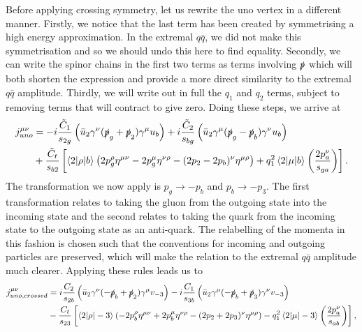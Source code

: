Before applying crossing symmetry, let us rewrite the uno vertex in a different manner. Firstly, we notice that the last term has been created by symmetrising a high energy approximation. In the extremal $q\bar{q}$, we did not make this symmetrisation and so we should undo this here to find equality. Secondly, we can write the spinor chains in the first two terms as terms involving $\slashed{p}$ which will both shorten the expression and provide a more direct similarity to the extremal $q\bar{q}$ amplitude. Thirdly, we will write out in full the $q_1$ and $q_2$ terms, subject to removing terms that will contract to give zero. Doing these steps, we arrive at
\begin{equation}
\begin{split}
j_{uno}^{\mu \nu} &= -i \frac{\tilde{C}_1}{s_{2g}} \left(\bar{u}_2 \gamma^\nu (\slashed{p}_g + \slashed{p}_2) \gamma^\mu u_b \right) + i \frac{\tilde{C}_2}{s_{bg}} \left(\bar{u}_2 \gamma^\mu (\slashed{p}_g - \slashed{p}_b)\gamma^\nu u_b \right) \\
&+ \frac{\tilde{C}_t}{s_{b2}} \left[\mathinner{\langle2\vert\rho\vert b\rangle}_{} \left(2p_g^\rho \eta^{\mu \nu} - 2 p_g^\mu \eta^{\nu \rho} - (2p_2 - 2p_b)^\nu \eta^{\mu \rho} \right) + q_1^2 \mathinner{\langle2\vert\mu\vert b\rangle}_{} \left(\frac{2p_a^\nu}{s_{ga}} \right) \right].
\end{split}
\end{equation}
The transformation we now apply is $p_g \to -p_b$ and $p_b \to -p_3$. The first transformation relates to taking the gluon from the outgoing state into the incoming state and the second relates to taking the quark from the incoming state to the outgoing state as an anti-quark. The relabelling of the momenta in this fashion is chosen such that the conventions for incoming and outgoing particles are preserved, which will make the relation to the extremal $q\bar{q}$ amplitude much clearer. Applying these rules leads us to
\begin{equation}
\begin{split}
j_{uno, crossed}^{\mu \nu} &= i \frac{C_2}{s_{2b}} \left(\bar{u}_2 \gamma^\nu (-\slashed{p}_b + \slashed{p}_2) \gamma^\mu v_{-3} \right) - i \frac{C_1}{s_{3b}} \left(\bar{u}_2 \gamma^\mu (-\slashed{p}_b + \slashed{p}_3)\gamma^\nu v_{-3} \right) \\
&- \frac{C_t}{s_{23}} \left[\mathinner{\langle2\vert\rho\vert-3\rangle}_{} \left(-2p_b^\rho \eta^{\mu \nu} + 2 p_b^\mu \eta^{\nu \rho} - (2p_2 + 2p_3)^\nu \eta^{\mu \rho} \right) - q_1^2 \mathinner{\langle2\vert\mu\vert-3\rangle}_{} \left(\frac{2p_a^\nu}{s_{ab}} \right) \right],
\end{split}
\end{equation}
